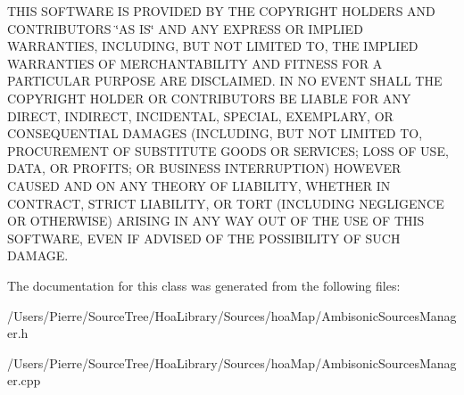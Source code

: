 T\-H\-I\-S S\-O\-F\-T\-W\-A\-R\-E I\-S P\-R\-O\-V\-I\-D\-E\-D B\-Y T\-H\-E C\-O\-P\-Y\-R\-I\-G\-H\-T H\-O\-L\-D\-E\-R\-S A\-N\-D C\-O\-N\-T\-R\-I\-B\-U\-T\-O\-R\-S \char`\"{}\-A\-S I\-S\char`\"{} A\-N\-D A\-N\-Y E\-X\-P\-R\-E\-S\-S O\-R I\-M\-P\-L\-I\-E\-D W\-A\-R\-R\-A\-N\-T\-I\-E\-S, I\-N\-C\-L\-U\-D\-I\-N\-G, B\-U\-T N\-O\-T L\-I\-M\-I\-T\-E\-D T\-O, T\-H\-E I\-M\-P\-L\-I\-E\-D W\-A\-R\-R\-A\-N\-T\-I\-E\-S O\-F M\-E\-R\-C\-H\-A\-N\-T\-A\-B\-I\-L\-I\-T\-Y A\-N\-D F\-I\-T\-N\-E\-S\-S F\-O\-R A P\-A\-R\-T\-I\-C\-U\-L\-A\-R P\-U\-R\-P\-O\-S\-E A\-R\-E D\-I\-S\-C\-L\-A\-I\-M\-E\-D. I\-N N\-O E\-V\-E\-N\-T S\-H\-A\-L\-L T\-H\-E C\-O\-P\-Y\-R\-I\-G\-H\-T H\-O\-L\-D\-E\-R O\-R C\-O\-N\-T\-R\-I\-B\-U\-T\-O\-R\-S B\-E L\-I\-A\-B\-L\-E F\-O\-R A\-N\-Y D\-I\-R\-E\-C\-T, I\-N\-D\-I\-R\-E\-C\-T, I\-N\-C\-I\-D\-E\-N\-T\-A\-L, S\-P\-E\-C\-I\-A\-L, E\-X\-E\-M\-P\-L\-A\-R\-Y, O\-R C\-O\-N\-S\-E\-Q\-U\-E\-N\-T\-I\-A\-L D\-A\-M\-A\-G\-E\-S (I\-N\-C\-L\-U\-D\-I\-N\-G, B\-U\-T N\-O\-T L\-I\-M\-I\-T\-E\-D T\-O, P\-R\-O\-C\-U\-R\-E\-M\-E\-N\-T O\-F S\-U\-B\-S\-T\-I\-T\-U\-T\-E G\-O\-O\-D\-S O\-R S\-E\-R\-V\-I\-C\-E\-S; L\-O\-S\-S O\-F U\-S\-E, D\-A\-T\-A, O\-R P\-R\-O\-F\-I\-T\-S; O\-R B\-U\-S\-I\-N\-E\-S\-S I\-N\-T\-E\-R\-R\-U\-P\-T\-I\-O\-N) H\-O\-W\-E\-V\-E\-R C\-A\-U\-S\-E\-D A\-N\-D O\-N A\-N\-Y T\-H\-E\-O\-R\-Y O\-F L\-I\-A\-B\-I\-L\-I\-T\-Y, W\-H\-E\-T\-H\-E\-R I\-N C\-O\-N\-T\-R\-A\-C\-T, S\-T\-R\-I\-C\-T L\-I\-A\-B\-I\-L\-I\-T\-Y, O\-R T\-O\-R\-T (I\-N\-C\-L\-U\-D\-I\-N\-G N\-E\-G\-L\-I\-G\-E\-N\-C\-E O\-R O\-T\-H\-E\-R\-W\-I\-S\-E) A\-R\-I\-S\-I\-N\-G I\-N A\-N\-Y W\-A\-Y O\-U\-T O\-F T\-H\-E U\-S\-E O\-F T\-H\-I\-S S\-O\-F\-T\-W\-A\-R\-E, E\-V\-E\-N I\-F A\-D\-V\-I\-S\-E\-D O\-F T\-H\-E P\-O\-S\-S\-I\-B\-I\-L\-I\-T\-Y O\-F S\-U\-C\-H D\-A\-M\-A\-G\-E. 

The documentation for this class was generated from the following files\-:\begin{DoxyCompactItemize}
\item 
/\-Users/\-Pierre/\-Source\-Tree/\-Hoa\-Library/\-Sources/hoa\-Map/Ambisonic\-Sources\-Manager.\-h\item 
/\-Users/\-Pierre/\-Source\-Tree/\-Hoa\-Library/\-Sources/hoa\-Map/Ambisonic\-Sources\-Manager.\-cpp\end{DoxyCompactItemize}
